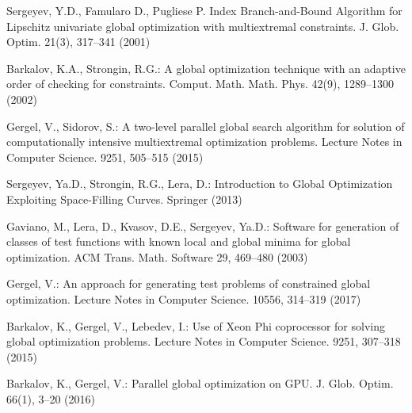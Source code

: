 \documentclass[smallextended]{svjour3}       %
\begin{document}
\begin{thebibliography}{}
Sergeyev, Y.D., Famularo D., Pugliese P. Index Branch-and-Bound Algorithm for Lipschitz univariate global optimization with multiextremal constraints. J. Glob. Optim. 21(3), 317--341 (2001) 

Barkalov, K.A., Strongin, R.G.: A global optimization technique with an adaptive order of checking for constraints. Comput. Math. Math. Phys. 42(9), 1289--1300 (2002)

Gergel, V., Sidorov, S.: A two-level parallel global search algorithm for solution of computationally intensive multiextremal optimization problems. Lecture Notes in Computer Science. 9251, 505--515 (2015)

Sergeyev, Ya.D., Strongin, R.G., Lera, D.: Introduction to Global Optimization Exploiting Space-Filling Curves. Springer (2013)

Gaviano, M., Lera, D., Kvasov, D.E., Sergeyev, Ya.D.: Software for generation of classes of test functions with known local and global minima for global optimization. ACM Trans. Math. Software 29, 469--480 (2003)




Gergel, V.: An approach for generating test problems of constrained global optimization. Lecture Notes in Computer Science. 10556, 314--319 (2017)

Barkalov, K., Gergel, V., Lebedev, I.: Use of Xeon Phi coprocessor for solving global optimization problems. Lecture Notes in Computer Science. 9251, 307--318 (2015)

Barkalov, K., Gergel, V.: Parallel global optimization on GPU. J. Glob. Optim. 66(1), 3--20 (2016)



%
\end{thebibliography}
\end{document}
